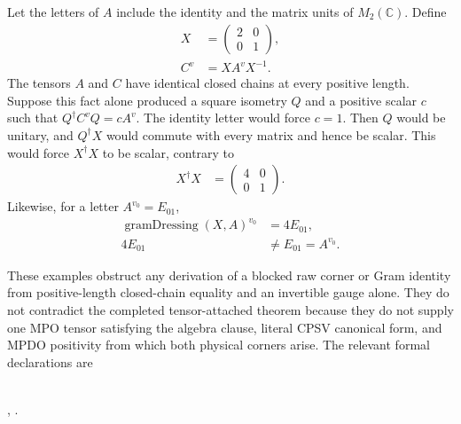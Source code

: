 \documentclass{article}
\begin{document}
Let the letters of $A$ include the identity and the matrix units of
$M_2(\mathbb C)$. Define
\begin{align}
    X
    &=\begin{pmatrix}2&0\\0&1\end{pmatrix},
    \label{eq:cpsv16_two_site_sector_unitary_gauge_gap_generic_similarity_matrix}\\
    C^v
    &=XA^vX^{-1}.
    \label{eq:cpsv16_two_site_sector_unitary_gauge_gap_generic_similarity_tensor}
\end{align}
The tensors $A$ and $C$ have identical closed chains at every positive
length. Suppose this fact alone produced a square isometry $Q$ and a positive
scalar $c$ such that $Q^\dagger C^vQ=cA^v$. The identity letter would force
$c=1$. Then $Q$ would be unitary, and $Q^\dagger X$ would commute with every
matrix and hence be scalar. This would force $X^\dagger X$ to be scalar,
contrary to
\begin{align}
    X^\dagger X
    &=\begin{pmatrix}4&0\\0&1\end{pmatrix}.
    \label{eq:cpsv16_two_site_sector_unitary_gauge_gap_generic_similarity_gram}
\end{align}
Likewise, for a letter $A^{v_0}=E_{01}$,
\begin{align}
    \operatorname{gramDressing}(X,A)^{v_0}
    &=4E_{01},
    \label{eq:cpsv16_two_site_sector_unitary_gauge_gap_generic_gram_dressed_letter}\\
    4E_{01}
    &\neq E_{01}=A^{v_0}.
    \label{eq:cpsv16_two_site_sector_unitary_gauge_gap_generic_gram_obstruction}
\end{align}

These examples obstruct any derivation of a blocked raw corner or Gram
identity from positive-length closed-chain equality and an invertible gauge
alone. They do not contradict the completed tensor-attached theorem because
they do not supply one MPO tensor satisfying the algebra clause, literal CPSV
canonical form, and MPDO positivity from which both physical corners arise.
The relevant formal declarations are
\begin{center}
\scriptsize
\mbox{}\\
\mbox{,}\qquad
\mbox{.}
\end{center}
\end{document}
